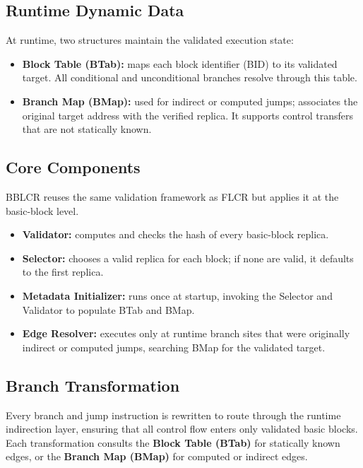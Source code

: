 \subsection*{Runtime Dynamic Data}
At runtime, two structures maintain the validated execution state:

\begin{itemize}
  \item \textbf{Block Table (BTab):} maps each block identifier (BID) to its validated target.
        All conditional and unconditional branches resolve through this table.
  \item \textbf{Branch Map (BMap):} used for indirect or computed jumps; associates the original
        target address with the verified replica.  It supports control transfers that are not statically known.
\end{itemize}

\subsection*{Core Components}
BBLCR reuses the same validation framework as FLCR but applies it at the basic-block level.

\begin{itemize}
  \item \textbf{Validator:} computes and checks the hash of every basic-block replica.
  \item \textbf{Selector:} chooses a valid replica for each block; if none are valid, it defaults to the first replica.
  \item \textbf{Metadata Initializer:} runs once at startup, invoking the Selector and Validator to populate BTab and BMap.
  \item \textbf{Edge Resolver:} executes only at runtime branch sites that were originally indirect or computed jumps,
        searching BMap for the validated target.
\end{itemize}

\subsection*{Branch Transformation}
Every branch and jump instruction is rewritten to route through the runtime indirection
layer, ensuring that all control flow enters only validated basic blocks.
Each transformation consults the \textbf{Block Table (BTab)} for statically known edges,
or the \textbf{Branch Map (BMap)} for computed or indirect edges.

